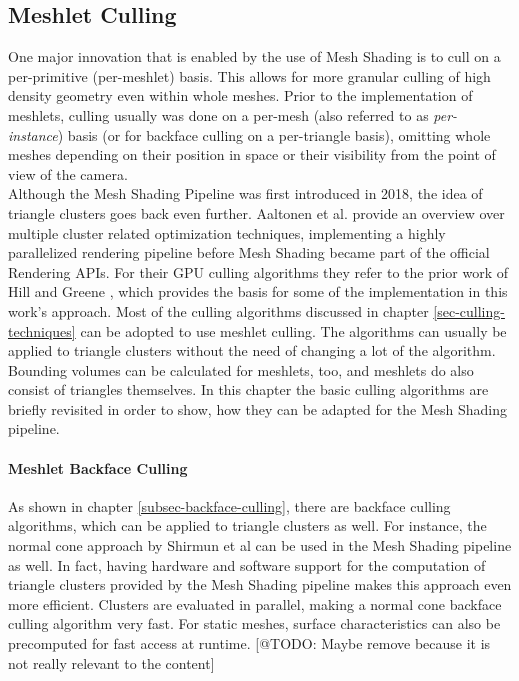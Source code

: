 \subsection*{Meshlet Culling} \label{subsec-meshlet-culling}

One major innovation that is enabled by the use of Mesh Shading is to cull on a per-primitive (per-meshlet) basis. 
This allows for more granular culling of high density geometry even within whole meshes. Prior to the implementation 
of meshlets, culling usually was done on a per-mesh (also referred to as \emph{per-instance}) basis (or for backface 
culling on a per-triangle basis), omitting whole meshes depending on their position in space or their visibility from 
the point of view of the camera.\\

\noindent
Although the Mesh Shading Pipeline was first introduced in 2018, the idea of triangle clusters goes back even further.
Aaltonen et al. \cite{Aaltonen2015} provide an overview over multiple cluster related optimization techniques, implementing 
a highly parallelized rendering pipeline before Mesh Shading became part of the official Rendering \ac{API}s.
For their \ac{GPU} culling algorithms they refer to the prior work of Hill \cite{Hill11} and Greene \cite{Greene93}, which 
provides the basis for some of the implementation in this work's approach. Most of the culling algorithms discussed in chapter 
\ref{sec-culling-techniques} can be adopted to use meshlet culling. The algorithms can usually be applied to triangle clusters 
without the need of changing a lot of the algorithm. Bounding volumes can be calculated for meshlets, too, and meshlets do also 
consist of triangles themselves. In this chapter the basic culling algorithms are briefly revisited in order to show, how they 
can be adapted for the Mesh Shading pipeline.


\paragraph*{Meshlet Backface Culling} \label{subsubsec-meshlet-backface-culling}

As shown in chapter \ref{subsec-backface-culling}, there are backface culling algorithms, which can be applied to 
triangle clusters as well. For instance, the normal cone approach by Shirmun et al \cite{Shirmun1993} can be used 
in the Mesh Shading pipeline as well. In fact, having hardware and software support for the computation of triangle 
clusters provided by the Mesh Shading pipeline makes this approach even more efficient. Clusters are evaluated in 
parallel, making a normal cone backface culling algorithm very fast. For static meshes, surface characteristics can 
also be precomputed for fast access at runtime. [@TODO: Maybe remove because it is not really relevant to the content]

